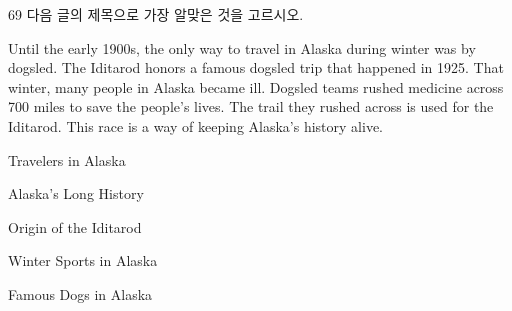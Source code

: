 \begin{question}{69}
다음 글의 제목으로 가장 알맞은 것을 고르시오.
\begin{framedtext}
Until the early 1900s, the only way to travel in Alaska during winter was by dogsled. The Iditarod honors a famous dogsled trip that happened in 1925. That winter, many people in Alaska became ill. Dogsled teams rushed medicine across 700 miles to save the people's lives. The trail they rushed across is used for the Iditarod. This race is a way of keeping Alaska's history alive.
\end{framedtext}
\begin{choices}
  \item Travelers in Alaska
  \item Alaska's Long History
  \item Origin of the Iditarod
  \item Winter Sports in Alaska
  \item Famous Dogs in Alaska
\end{choices}
\end{question}
